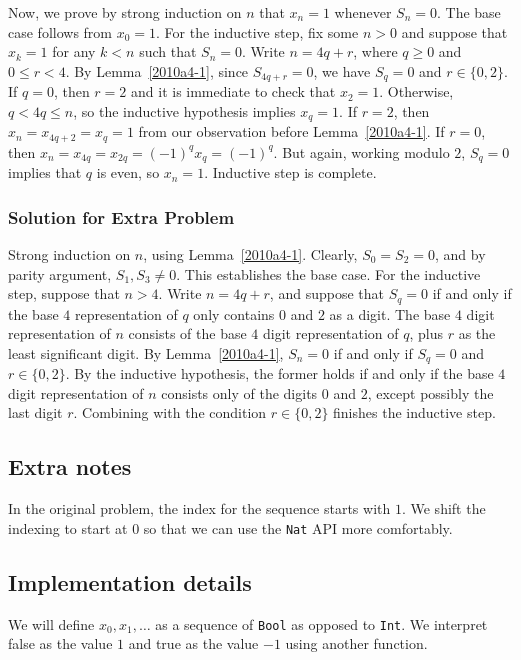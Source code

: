 Now, we prove by strong induction on $n$ that $x_n = 1$ whenever $S_n = 0$.
The base case follows from $x_0 = 1$.
For the inductive step, fix some $n > 0$ and suppose that $x_k = 1$ for any $k < n$ such that $S_n = 0$.
Write $n = 4q + r$, where $q \geq 0$ and $0 \leq r < 4$.
By Lemma~\ref{2010a4-1}, since $S_{4q + r} = 0$, we have $S_q = 0$ and $r \in \{0, 2\}$.
If $q = 0$, then $r = 2$ and it is immediate to check that $x_2 = 1$.
Otherwise, $q < 4q \leq n$, so the inductive hypothesis implies $x_q = 1$.
If $r = 2$, then $x_n = x_{4q + 2} = x_q = 1$ from our observation before Lemma~\ref{2010a4-1}.
If $r = 0$, then $x_n = x_{4q} = x_{2q} = (-1)^q x_q = (-1)^q$.
But again, working modulo $2$, $S_q = 0$ implies that $q$ is even, so $x_n = 1$.
Inductive step is complete.



\subsubsection*{Solution for Extra Problem}

Strong induction on $n$, using Lemma~\ref{2010a4-1}.
Clearly, $S_0 = S_2 = 0$, and by parity argument, $S_1, S_3 \neq 0$.
This establishes the base case.
For the inductive step, suppose that $n > 4$.
Write $n = 4q + r$, and suppose that $S_q = 0$ if and only if the base $4$ representation of $q$ only contains $0$ and $2$ as a digit.
The base $4$ digit representation of $n$ consists of the base $4$ digit representation of $q$, plus $r$ as the least significant digit.
By Lemma~\ref{2010a4-1}, $S_n = 0$ if and only if $S_q = 0$ and $r \in \{0, 2\}$.
By the inductive hypothesis, the former holds if and only if the base $4$ digit representation of $n$ consists only of the digits $0$ and $2$, except possibly the last digit $r$.
Combining with the condition $r \in \{0, 2\}$ finishes the inductive step.



\subsection*{Extra notes}

In the original problem, the index for the sequence starts with $1$.
We shift the indexing to start at $0$ so that we can use the \texttt{Nat} API more comfortably.



\subsection*{Implementation details}

We will define $x_0, x_1, \ldots$ as a sequence of \texttt{Bool} as opposed to \texttt{Int}.
We interpret false as the value $1$ and true as the value $-1$ using another function.
